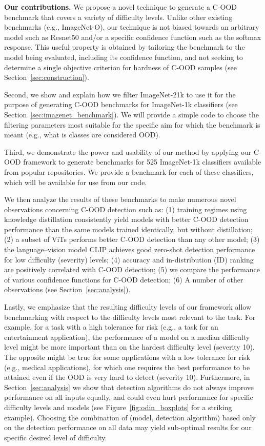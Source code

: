 \documentclass[table]{article} \usepackage{PRIMEarxiv}
\begin{document}
\textbf{Our contributions.} We propose a novel technique to generate a C-OOD benchmark that covers a variety of difficulty levels.
Unlike other existing benchmarks (e.g., ImageNet-O), our technique is not biased towards an arbitrary model such as Resnet50 and/or a specific confidence function such as the softmax response. This useful property is obtained by tailoring the benchmark to the model being evaluated, including its confidence function, and not seeking to determine a single objective criterion for hardness of C-OOD samples (see Section~\ref{sec:construction}).

Second, we show and explain how we filter ImageNet-21k to use it for the purpose of generating C-OOD benchmarks for ImageNet-1k \citep{5206848} classifiers (see Section~\ref{sec:imagenet_benchmark}). 
We will provide a simple code to choose the filtering parameters most suitable for the specific aim for which the benchmark is meant (e.g., what is classes are considered OOD).

Third, we demonstrate the power and usability of our method by applying our C-OOD framework to generate benchmarks for 525 ImageNet-1k classifiers available from popular repositories. We provide a benchmark for each of these classifiers, which will be available for use from our code.

We then 
analyze  the results of these benchmarks to make numerous novel observations concerning C-OOD detection such as: 
(1) training regimes using knowledge distillation \citep{hinton2015distilling} consistently yield models with better C-OOD detection performance than the same models trained identically, but without distillation; (2) a subset of ViTs performs better C-OOD detection than any other model; (3) the language--vision model CLIP achieves good zero-shot detection performance for low difficulty (severity) levels; (4) accuracy and in-distribution (ID) ranking are positively correlated with C-OOD detection; 
(5) we compare the performance of various confidence functions for C-OOD detection; 
(6) A number of other observations (see Section~\ref{sec:analysis}).

Lastly, we emphasize that the resulting difficulty levels of our framework allow benchmarking with respect to the difficulty levels most relevant to the task. For example, for a task with a high tolerance for risk (e.g., a task for an entertainment application), the performance of a model on a median difficulty level might be more important than on the hardest difficulty level (severity 10). The opposite might be true for some applications with a low tolerance for risk (e.g., medical applications), for which one requires the best performance to be attained even if the OOD is very hard to detect (severity 10). 
Furthermore, in Section~\ref{sec:analysis} we show that detection algorithms do not always improve performance on all inputs equally, and could even hurt performance for specific difficulty levels and models (see Figure~\ref{fig:odin_boxplots} for a striking example). Choosing the combination of (model, detection algorithm) based only on the detection performance on all data may yield sub-optimal results for our specific desired level of difficulty.
\end{document}
